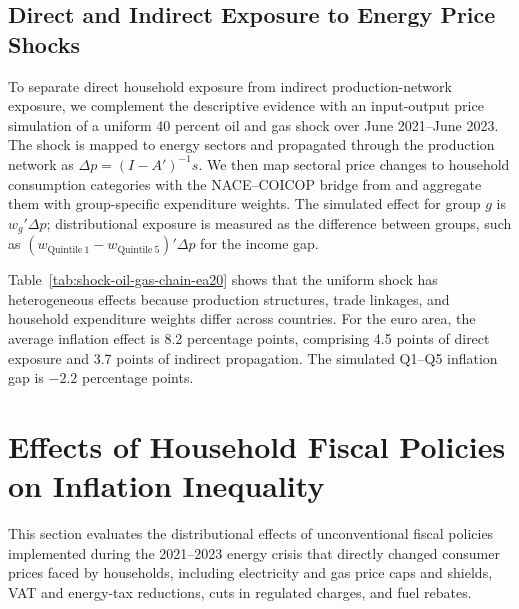 \documentclass[11pt]{article}
\begin{document}



\subsection{Direct and Indirect Exposure to Energy Price Shocks}

To separate direct household exposure from indirect production-network exposure, we complement the
descriptive evidence with an input-output price simulation of a uniform 40 percent oil and gas shock
over June 2021--June 2023. The shock is mapped to energy sectors and propagated through the production network as $\Delta
p=(I-A')^{-1}s$. We then map sectoral price changes to household consumption categories with the
NACE--COICOP bridge from \citet{cai2020bridging} and aggregate them with group-specific expenditure
weights. The simulated effect for group $g$ is $w_g'\Delta p$; distributional exposure is measured
as the difference between groups, such as $(w_{\mathrm{Quintile\ 1}}-w_{\mathrm{Quintile\
5}})'\Delta p$ for the income gap.



Table~\ref{tab:shock-oil-gas-chain-ea20} shows that the uniform shock has heterogeneous effects because production structures,
trade linkages, and household expenditure weights differ across countries. For the euro area,
the average inflation effect is 8.2 percentage points, comprising 4.5 points of direct exposure and
3.7 points of indirect propagation. The simulated Q1--Q5 inflation gap is $-2.2$ percentage points.

\FloatBarrier

\section{Effects of Household Fiscal Policies on Inflation Inequality}
\label{sec:fiscal-policies}

This section evaluates the distributional effects of unconventional fiscal policies implemented during the 2021–2023 energy crisis 
that directly changed consumer prices faced by households, including electricity and gas price caps and shields, 
VAT and energy-tax reductions, cuts in regulated charges, and fuel rebates.
\end{document}
